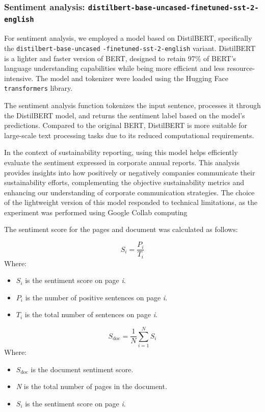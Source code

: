 \documentclass[times]{oupau}
\begin{document}
\subsubsection{Sentiment analysis: \texttt{distilbert-base-uncased-finetuned-sst-2-english}}

For sentiment analysis, we employed a model based on DistilBERT, specifically the \texttt{distilbert-base-uncased} \texttt{-finetuned-sst-2-english} variant. DistilBERT is a lighter and faster version of BERT, designed to retain 97\% of BERT's language understanding capabilities while being more efficient and less resource-intensive. The model and tokenizer were loaded using the Hugging Face \texttt{transformers} library.
\par
\justify

The sentiment analysis function tokenizes the input sentence, processes it through the DistilBERT model, and returns the sentiment label based on the model's predictions. Compared to the original BERT, DistilBERT is more suitable for large-scale text processing tasks due to its reduced computational requirements.
\par
\justify

In the context of sustainability reporting, using this model helps efficiently evaluate the sentiment expressed in corporate annual reports. This analysis provides insights into how positively or negatively companies communicate their sustainability efforts, complementing the objective sustainability metrics and enhancing our understanding of corporate communication strategies. The choice of the lightweight version of this model responded to technical limitations, as the experiment was performed using Google Collab computing
\par
\justify
The sentiment score for the pages and document was calculated as follows:
\par
\justify
\begin{equation}
S_i = \displaystyle\frac{P_i}{T_i}
\end{equation}
Where:
\begin{itemize}
        \item $S_i$ is the sentiment score on page \textit{i}.
        \item $P_i$ is the number of positive sentences on page \textit{i}.
        \item $T_i$ is the total number of sentences on page \textit{i}.
\end{itemize}

\begin{equation}
S_{\text{doc}} = \displaystyle\frac{1}{N} \sum_{i=1}^{N} S_i
\end{equation}
Where:
\begin{itemize}
        \item $S_{\text{doc}}$ is the document sentiment score.
        \item \textit{N} is the total number of pages in the document.
        \item $S_i$ is the sentiment score on page \textit{i}.
\end{itemize}
\end{document}
